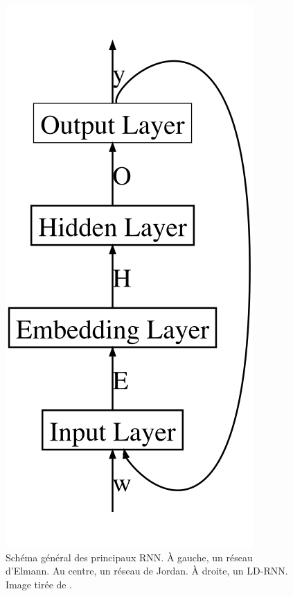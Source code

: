\documentclass[12pt,a4paper,times,twoside,openright]{report}
\begin{document}
\begin{figure}[ht!]
\begin{minipage}{0.325\linewidth}
    \includegraphics[scale=0.4]{images/NN/LD-RNN/OcramRNN_inkscape}
    \end{minipage}
    \caption{Schéma général des principaux RNN. À gauche, un réseau d'Elmann. Au centre, un réseau de Jordan. À droite, un LD-RNN. Image tirée de \citet{dupont2017a}.}
    \label{fig:3architecgtures}
\end{figure}
\end{document}
